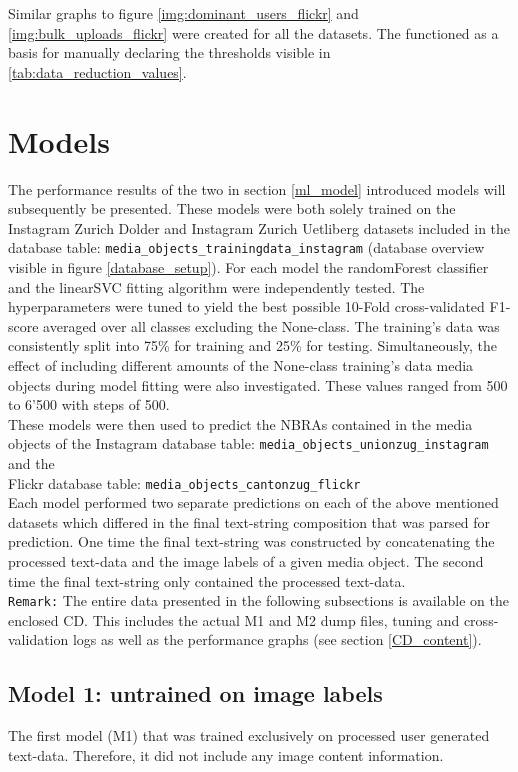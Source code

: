 Similar graphs to figure \ref{img:dominant_users_flickr} and \ref{img:bulk_uploads_flickr} were created for all the datasets. The functioned as a basis for manually declaring the thresholds visible in \ref{tab:data_reduction_values}. 

\section{Models} \label{results_models}
The performance results of the two in section \ref{ml_model} introduced models will subsequently be presented. These models were both solely trained on the Instagram Zurich Dolder and Instagram Zurich Uetliberg datasets included in the database table: \texttt{media\_objects\_trainingdata\_instagram} (database overview visible in figure \ref{database_setup}). For each model the randomForest classifier and the linearSVC fitting algorithm were independently tested. The hyperparameters were tuned to yield the best possible 10-Fold cross-validated F1-score averaged over all classes excluding the None-class. The training's data was consistently split into 75\% for training and 25\% for testing. Simultaneously, the effect of including different amounts of the None-class training's data media objects during model fitting were also investigated. These values ranged from 500 to 6'500 with steps of 500.\\
These models were then used to predict the NBRAs contained in the media objects of the Instagram database table: \texttt{media\_objects\_unionzug\_instagram} and the \\Flickr database table: \texttt{media\_objects\_cantonzug\_flickr}\\
Each model performed two separate predictions on each of the above mentioned datasets which differed in the final text-string composition that was parsed for prediction. One time the final text-string was constructed by concatenating the processed text-data and the image labels of a given media object. The second time the final text-string only contained the processed text-data.\\
\newline
\texttt{Remark:} The entire data presented in the following subsections is available on the enclosed CD. This includes the actual M1 and M2 dump files, tuning and cross-validation logs as well as the performance graphs (see section \ref{CD_content}).

\subsection{Model 1: untrained on image labels}
The first model (M1) that was trained exclusively on processed user generated text-data. Therefore, it did not include any image content information.

